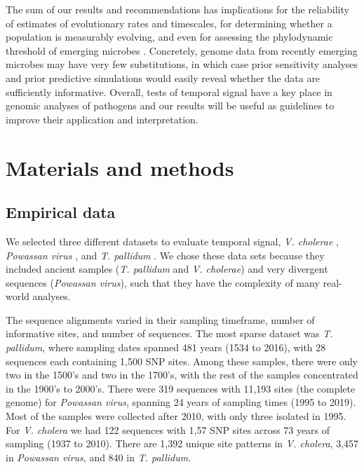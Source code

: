 \documentclass[10pt,letterpaper]{article}
\begin{document}
The sum of our results and recommendations has implications for the reliability of estimates of evolutionary rates and timescales, for determining whether a population is measurably evolving, and even for assessing the phylodynamic threshold of emerging microbes \cite{duchene2020temporal}. Concretely, genome data from recently emerging microbes may have very few substitutions, in which case prior sensitivity analyses and prior predictive simulations would easily reveal whether the data are sufficiently informative. Overall, tests of temporal signal have a key place in genomic analyses of pathogens and our results will be useful as guidelines to improve their application and interpretation.

\section*{Materials and methods}
\subsection*{Empirical data}
We selected three different datasets to evaluate temporal signal, \textit{V. cholerae} \cite{devault2014second}, \textit{Powassan virus} \cite{vogels2023phylogeographic}, and \textit{T. pallidum} \cite{majander2020ancient}. {We chose these data sets because they included ancient samples (\textit{T. pallidum} and \textit{V. cholerae}) and very divergent sequences (\textit{Powassan virus}), such that they have the complexity of many real-world analyses.}

The sequence alignments varied in their sampling timeframe, number of informative sites, and number of sequences. The most sparse dataset was \textit{T. pallidum}, where sampling dates spanned 481 years (1534 to 2016), with 28 sequences each containing 1,500 SNP sites. Among these samples, there were only two in the 1500's and two in the 1700's, with the rest of the samples concentrated in the 1900's to 2000's. There were 319 sequences with 11,193 sites (the complete genome) for \textit{Powassan virus}, spanning 24 years of sampling times (1995 to 2019). Most of the samples were collected after 2010, with only three isolated in 1995. For \textit{V. cholera} we had 122  sequences with 1,57 SNP sites across 73 years of sampling (1937 to 2010). There are 1,392 unique site patterns in \textit{V. cholera}, 3,457 in \textit{Powassan virus}, and 840 in \textit{T. pallidum}. 
\end{document}
